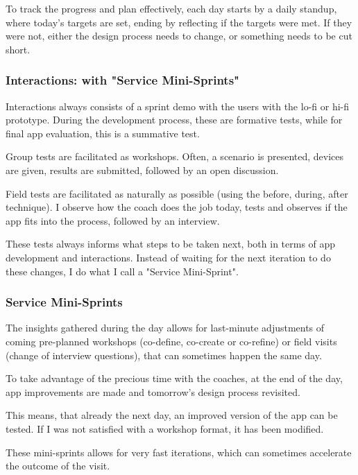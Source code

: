   To track the progress and plan effectively, each day starts by a daily standup, where today's targets are set, ending by reflecting if the targets were met. If they were not, either the design process needs to change, or something needs to be cut short.

  \subsubsection{Interactions: with "Service Mini-Sprints"}
  Interactions always consists of a sprint demo with the users with the lo-fi or hi-fi prototype. During the development process, these are formative tests, while for final app evaluation, this is a summative test.

    Group tests are facilitated as workshops. Often, a scenario is presented, devices are given, results are submitted, followed by an open discussion.

    Field tests are facilitated as naturally as possible (using the before, during, after technique). I observe how the coach does the job today, tests and observes if the app fits into the process, followed by an interview.

    These tests always informs what steps to be taken next, both in terms of app development and interactions. Instead of waiting for the next iteration to do these changes, I do what I call a "Service Mini-Sprint".

    \subsubsection{Service Mini-Sprints}
    The insights gathered during the day allows for last-minute adjustments of coming pre-planned workshops (co-define, co-create or co-refine) or field visits (change of interview questions), that can sometimes happen the same day.

    To take advantage of the precious time with the coaches, at the end of the day, app improvements are made and tomorrow's design process revisited.

    This means, that already the next day, an improved version of the app can be tested. If I was not satisfied with a workshop format, it has been modified.

    These mini-sprints allows for very fast iterations, which can sometimes accelerate the outcome of the visit.
